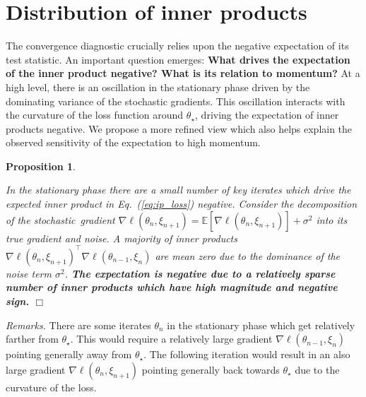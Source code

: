 \documentclass[conference]{IEEEtran}
\newcommand{\Ex}[1]{\mathbb{E}[ #1 ]}
\newtheorem{proposition}[theorem]{Proposition}
\begin{document}
\section{Distribution  of inner products}\label{sec:distribution_IP} 

The convergence diagnostic crucially relies upon the negative expectation of its test statistic. 
An important question emerges: \textbf{What drives the expectation of the inner product negative?
What is its relation to momentum?}
At a high level, there is an oscillation in the stationary phase driven by the dominating variance of the stochastic gradients.
This oscillation interacts with the curvature of the loss function around $\theta_\star$, driving the expectation of inner products negative.
We propose a more refined view which also helps explain the observed sensitivity of the expectation to high momentum.

\begin{proposition}\label{prop:noise_key_iter}

In the stationary phase there are a small number of key iterates which drive the expected inner product in Eq.~(\ref{eq:ip_loss}) negative.
Consider the decomposition of the stochastic~gradient $\nabla \ell ( \theta_n, \xi_{n+1} ) = \Ex{ \nabla \ell ( \theta_n, \xi_{n+1} )} + \sigma^2$
into its true gradient and noise.  A majority of inner products\\ $\nabla \ell ( \theta_n, \xi_{n+1} ) ^\top \nabla \ell ( \theta_{n-1}, \xi_{n} )$ are mean zero due to the dominance of the noise term $\sigma^2$.  \textbf{The expectation is negative due to a relatively sparse number of inner products which have high magnitude and negative sign.}
\hfill$\Box$
\end{proposition}

\emph{Remarks.}
There are some iterates $\theta_n$ in the stationary phase which get relatively farther from $\theta_\star$.
This would require a relatively large gradient $\nabla \ell (\theta_{n-1}, \xi_n)$ pointing generally away from $\theta_\star$.
The following iteration would result in an also large gradient $\nabla \ell (\theta_{n}, \xi_{n+1})$ pointing generally back towards $\theta_\star$ due to the curvature of the loss. 
\end{document}
